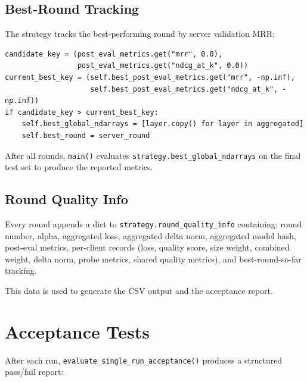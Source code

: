 \documentclass[12pt,a4paper]{article}
\begin{document}
\subsection{Best-Round Tracking}

The strategy tracks the best-performing round by server validation MRR:

\begin{lstlisting}[caption={Best-round selection logic}]
candidate_key = (post_eval_metrics.get("mrr", 0.0),
                 post_eval_metrics.get("ndcg_at_k", 0.0))
current_best_key = (self.best_post_eval_metrics.get("mrr", -np.inf),
                    self.best_post_eval_metrics.get("ndcg_at_k", -np.inf))
if candidate_key > current_best_key:
    self.best_global_ndarrays = [layer.copy() for layer in aggregated]
    self.best_round = server_round
\end{lstlisting}

After all rounds, \texttt{main()} evaluates \texttt{strategy.best\_global\_ndarrays} on the final test set to produce the reported metrics.

\subsection{Round Quality Info}

Every round appends a dict to \texttt{strategy.round\_quality\_info} containing: round number, alpha, aggregated loss, aggregated delta norm, aggregated model hash, post-eval metrics, per-client records (loss, quality score, size weight, combined weight, delta norm, probe metrics, shared quality metrics), and best-round-so-far tracking.

This data is used to generate the CSV output and the acceptance report.

\section{Acceptance Tests}

After each run, \texttt{evaluate\_single\_run\_acceptance()} produces a structured pass/fail report:
\end{document}
